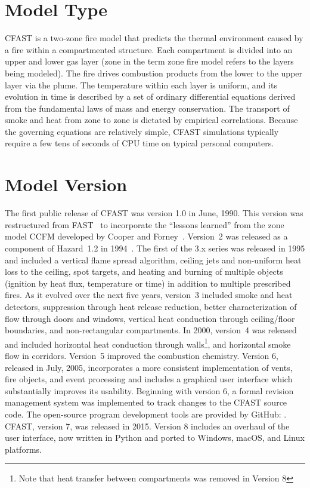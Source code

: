 
\section{Model Type}

CFAST is a two-zone fire model that predicts the thermal environment caused by a fire within a compartmented structure. Each compartment is divided into an upper and lower gas layer (zone in the term zone fire model refers to the layers being modeled). The fire drives combustion products from the lower to the upper layer via the plume. The temperature within each layer is uniform, and its evolution in time is described by a set of ordinary differential equations derived from the fundamental laws of mass and energy conservation. The transport of smoke and heat from zone to zone is dictated by empirical correlations. Because the governing equations are relatively simple, CFAST simulations typically require a few tens of seconds of CPU time on typical personal computers.


\section{Model Version}

The first public release of CFAST was version 1.0 in June, 1990. This version was restructured from FAST~\cite{Models:FAST} to incorporate the ``lessons learned'' from the zone model CCFM developed by Cooper and Forney~\cite{Models:CCFM}. Version~2 was released as a component of Hazard~1.2 in 1994~\cite{Models:HAZARDI, Models:HAZARDI_12}. The first of the 3.x series was released in 1995 and included a vertical flame spread algorithm, ceiling jets and non-uniform heat loss to the ceiling, spot targets, and heating and burning of multiple objects (ignition by heat flux, temperature or time) in addition to multiple prescribed fires. As it evolved over the next five years, version~3 included smoke and heat detectors, suppression through heat release reduction, better characterization of flow through doors and windows, vertical heat conduction through ceiling/floor boundaries, and non-rectangular compartments. In 2000, version~4 was released and included horizontal heat conduction through walls\footnote{Note that heat transfer between compartments was removed in Version 8}, and horizontal smoke flow in corridors. Version~5 improved the combustion chemistry. Version 6, released in July, 2005, incorporates a more consistent implementation of vents, fire objects, and event processing and includes a graphical user interface which substantially improves its usability. Beginning with version 6, a formal revision management system was implemented to track changes to the CFAST source code. The open-source program development tools are provided by GitHub: \href{https://github.com}{}. CFAST, version 7, was released in 2015.  Version 8 includes an overhaul of the user interface, now written in Python and ported to Windows, macOS, and Linux platforms.

